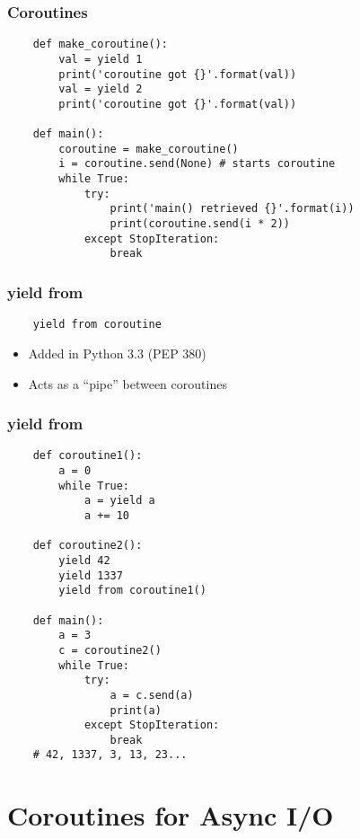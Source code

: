 \documentclass[ignorenonframetext,]{beamer}
\begin{document}
\begin{frame}[fragile]\frametitle{Coroutines}

\footnotesize{
\begin{verbatim}
    def make_coroutine():
        val = yield 1
        print('coroutine got {}'.format(val))
        val = yield 2
        print('coroutine got {}'.format(val))

    def main():
        coroutine = make_coroutine()
        i = coroutine.send(None) # starts coroutine
        while True:
            try:
                print('main() retrieved {}'.format(i))
                print(coroutine.send(i * 2))
            except StopIteration:
                break
\end{verbatim}
}

\end{frame}

\begin{frame}[fragile]\frametitle{yield from}

\begin{verbatim}
    yield from coroutine
\end{verbatim}

\begin{itemize}[<+->]
\itemsep1pt\parskip0pt
\item
  Added in Python 3.3 (PEP 380)
\item
  Acts as a ``pipe'' between coroutines
\end{itemize}

\end{frame}

\begin{frame}[fragile]\frametitle{yield from}

\tiny{
\begin{verbatim}
    def coroutine1():
        a = 0
        while True:
            a = yield a
            a += 10

    def coroutine2():
        yield 42
        yield 1337
        yield from coroutine1()

    def main():
        a = 3
        c = coroutine2()
        while True:
            try:
                a = c.send(a)
                print(a)
            except StopIteration:
                break
    # 42, 1337, 3, 13, 23...
\end{verbatim}
}

\end{frame}

\section{Coroutines for Async I/O}
\end{document}
